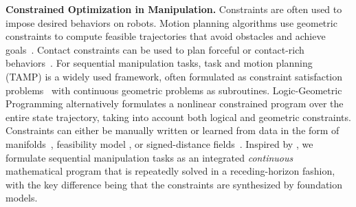 \textbf{Constrained Optimization in Manipulation.}
Constraints are often used to impose desired behaviors on robots. Motion planning algorithms use geometric constraints to compute feasible trajectories that avoid obstacles and achieve goals~\cite{kingston2018sampling,ratliff2009chomp,schulman2014motion,sundaralingam2023curobo,marcucci2024shortest,ratliff2018riemannian}.
Contact constraints can be used to plan forceful or contact-rich behaviors~\cite{posa2016optimization,mordatch2012discovery,mordatch2012contact,posa2014direct,howell2022predictive,liu2024model,lynch1996stable,hou2018fast,sleiman2023versatile,yang2024dynamic,graesdal2024towards,yunt2006trajectory,yunt2007combined,yunt2011augmented}.
For sequential manipulation tasks, task and motion planning (TAMP) \cite{kaelbling2010hierarchical,kaelbling2013integrated,garrett2021integrated} is a widely used framework, often formulated as constraint satisfaction problems~\cite{lagriffoul2012constraint,lagriffoul2014efficiently,lozano2014constraint,dantam2018incremental,yang2023compositional,silver2021learning,vu2024coast} with continuous geometric problems as subroutines.
Logic-Geometric Programming \cite{toussaint2015logic,toussaint2017multi,toussaint2018differentiable,ha2020probabilistic,xue2023d,driess2020deep} alternatively formulates a nonlinear constrained program over the entire state trajectory, taking into account both logical and geometric constraints.
Constraints can either be manually written or learned from data in the form of manifolds~\cite{sutanto2021learning}, feasibility model \cite{driess2020deep,yang2022sequence}, or signed-distance fields~\cite{driess2022learning,camps2022learning}.
Inspired by \cite{toussaint2022sequence}, we formulate sequential manipulation tasks as an integrated \emph{continuous} mathematical program that is repeatedly solved in a receding-horizon fashion, with the key difference being that the constraints are synthesized by foundation models.



